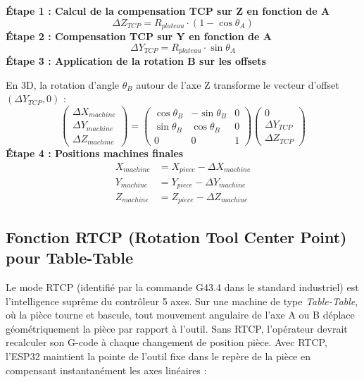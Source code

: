 \textbf{Étape 1 : Calcul de la compensation TCP sur Z en fonction de A}
\begin{equation}
    \Delta Z_{TCP} = R_{plateau} \cdot (1 - \cos\theta_A)
\end{equation}
\textbf{Étape 2 : Compensation TCP sur Y en fonction de A}
\begin{equation}
    \Delta Y_{TCP} = R_{plateau} \cdot \sin\theta_A
\end{equation}
\textbf{Étape 3 : Application de la rotation B sur les offsets}

En 3D, la rotation d'angle $\theta_B$ autour de l'axe Z transforme le vecteur d'offset $(\Delta Y_{TCP}, 0)$ :
\begin{equation}
    \begin{pmatrix} \Delta X_{machine} \\ \Delta Y_{machine} \\ \Delta Z_{machine} \end{pmatrix} =
    \begin{pmatrix}
        \cos\theta_B & -\sin\theta_B & 0 \\
        \sin\theta_B & \cos\theta_B & 0 \\
        0 & 0 & 1
    \end{pmatrix}
    \begin{pmatrix} 0 \\ \Delta Y_{TCP} \\ \Delta Z_{TCP} \end{pmatrix}
\end{equation}
\textbf{Étape 4 : Positions machines finales}
\begin{align}
    X_{machine} &= X_{piece} - \Delta X_{machine} \\
    Y_{machine} &= Y_{piece} - \Delta Y_{machine} \\
    Z_{machine} &= Z_{piece} - \Delta Z_{machine}
\end{align}

\subsection{Fonction RTCP (Rotation Tool Center Point) pour Table-Table}
Le mode RTCP (identifié par la commande G43.4 dans le standard industriel) est l'intelligence suprême du contrôleur 5 axes. Sur une machine de type \textit{Table-Table}, où la pièce tourne et bascule, tout mouvement angulaire de l'axe A ou B déplace géométriquement la pièce par rapport à l'outil.
Sans RTCP, l'opérateur devrait recalculer son G-code à chaque changement de position pièce. Avec RTCP, l'ESP32 maintient la pointe de l'outil fixe dans le repère de la pièce en compensant instantanément les axes linéaires :

